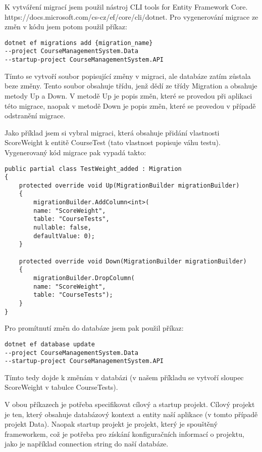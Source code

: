K vytváření migrací jsem použil nástroj CLI tools for Entity Framework Core. https://docs.microsoft.com/cs-cz/ef/core/cli/dotnet. Pro vygenerování migrace ze změn v kódu jsem potom použil příkaz:

\begin{lstlisting}
dotnet ef migrations add {migration_name} 
--project CourseManagementSystem.Data 
--startup-project CourseManagementSystem.API
\end{lstlisting}

Tímto se vytvoří soubor popisující změny v migraci, ale databáze zatím zůstala beze změny. Tento soubor obsahuje třídu, jenž dědí ze třídy Migration a obsahuje metody Up a Down. V metodě Up je popis změn, které se provedou při aplikaci této migrace, naopak v metodě Down je popis změn, které se provedou v případě odstranění migrace.

Jako příklad jsem si vybral migraci, která obsahuje přidání vlastnosti ScoreWeight k entitě CourseTest (tato vlastnost popisuje váhu testu).
Vygenerovaný kód migrace pak vypadá takto:

\begin{lstlisting}
public partial class TestWeight_added : Migration
{
	protected override void Up(MigrationBuilder migrationBuilder)
	{
		migrationBuilder.AddColumn<int>(
		name: "ScoreWeight",
		table: "CourseTests",
		nullable: false,
		defaultValue: 0);
	}
	
	protected override void Down(MigrationBuilder migrationBuilder)
	{
		migrationBuilder.DropColumn(
		name: "ScoreWeight",
		table: "CourseTests");
	}
}
\end{lstlisting}

Pro promítnutí změn do databáze jsem pak použil příkaz:

\begin{lstlisting}
dotnet ef database update 
--project CourseManagementSystem.Data 
--startup-project CourseManagementSystem.API
\end{lstlisting}

Tímto tedy dojde k změnám v databázi (v našem příkladu se vytvoří sloupec ScoreWeight v tabulce CourseTests).

V obou příkazech je potřeba specifikovat cílový a startup projekt. Cílový projekt je ten, který obsahuje databázový kontext a entity naší aplikace (v tomto případě projekt Data). Naopak startup projekt je projekt, který je spouštěný frameworkem, což je potřeba pro získání konfiguračních informací o projektu, jako je například connection string do naší databáze.

